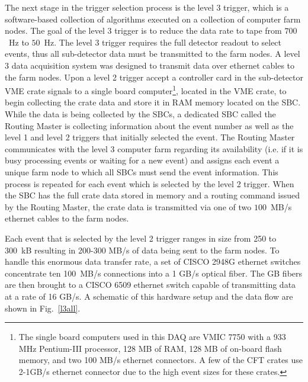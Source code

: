 The next stage in the trigger selection process is the level 3 trigger, which is a software-based collection of algorithms executed on a collection of computer farm nodes. The goal of the level 3 trigger is to reduce the data rate to tape from $700$~Hz to $50$~Hz. The level 3 trigger requires the full detector readout to select events, thus all sub-detector data must be transmitted to the farm nodes. A level 3 data acquisition system was designed to transmit data over ethernet cables to the farm nodes. Upon a level 2 trigger accept a controller card in the sub-detector VME crate signals to a single board computer\footnote{The single board computers used in this DAQ are VMIC 7750 with a 933 MHz Pentium-III processor, 128 MB of RAM, 128  MB of on-board flash memory, and two 100 MB/s ethernet connectors. A few of the CFT crates use 2-1GB/s ethernet connector due to the high event sizes for these crates.}, located in the VME crate, to begin collecting the crate data and store it in RAM memory located on the SBC. While the data is being collected by the SBCs, a dedicated SBC called the Routing Master is collecting information about the event number as well as the level 1 and level 2 triggers that initially selected the event. The Routing Master communicates with the level 3 computer farm regarding its availability (i.e. if it is busy processing events or waiting for a new event) and assigns each event a unique farm node to which all SBCs must send the event information. This process is repeated for each event which is selected by the level 2 trigger. When the SBC has the full crate data stored in memory and a routing command issued by the Routing Master, the crate data is transmitted via one of two $100$~MB/s ethernet cables to the farm nodes.

Each event that is selected by the level 2 trigger ranges in size from 250 to 300~kB resulting in 200-300 MB/s of data being sent to the farm nodes. To handle this enormous data transfer rate, a set of CISCO 2948G ethernet switches concentrate ten 100~MB/s connections into a 1 GB/s optical fiber. The GB fibers are then brought to a CISCO 6509 ethernet switch capable of transmitting data at a rate of 16 GB/s. A schematic of this hardware setup and the data flow are shown in Fig.~\ref{l3all}.

